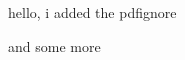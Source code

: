 \documentclass{article}
\begin{document}
hello, i added the pdfignore

and some more
\end{document}
